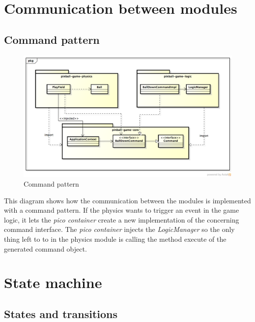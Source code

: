 \documentclass[fontsize=12pt,
               paper=a4,
               twoside=false,
               parskip=half,
               ]{scrartcl}
\begin{document}
\section{Communication between modules}

\subsection{Command pattern}

\begin{figure}[H]
	\centering
	\includegraphics[width=15.5cm]{./img/command-pattern1.png}
	\caption[Command pattern]{Command pattern}
	\label{fig:command_pattern}
\end{figure}

This diagram shows how the communication between the modules is implemented with a command pattern. If the physics wants to trigger an event in the game logic, it lets the \emph{pico container} create a new implementation of the concerning command interface. The \emph{pico container} injects the \emph{LogicManager} so the only thing left to to in the physics module is calling the method execute of the generated command object.


\section{State machine}

\subsection{States and transitions}
\end{document}
